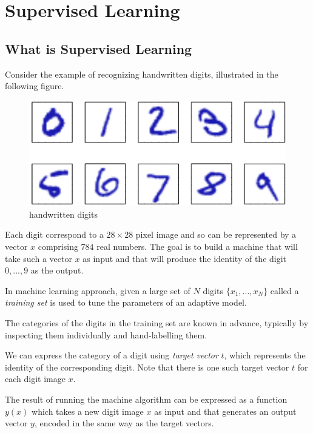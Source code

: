 \chapter{Supervised Learning}

\section{What is Supervised Learning}

Consider the example of recognizing handwritten digits, illustrated in the following figure.

\begin{figure}[h]
    \centering
    \includegraphics[scale=0.2]{chapter006/figures/fig001}
    \caption{handwritten digits}
    \label{handwritten digits}
\end{figure}

Each digit correspond to a $28 \times 28$ pixel image and so can be represented by a vector $x$ comprising $784$ real numbers. The goal is to build a machine that will take such a vector $x$ as input and that will produce the identity of the digit $0, ..., 9$ as the output.

In machine learning approach, given a large set of $N$ digits $\{x_1, ..., x_N\}$ called a \textit{training set} is used to tune the parameters of an adaptive model.

The categories of the digits in the training set are known in advance, typically by inspecting them individually and hand-labelling them.

We can express the category of a digit using \textit{target vector} $t$, which represents the identity of the corresponding digit. Note that there is one such target vector $t$ for each digit image $x$.

The result of running the machine algorithm can be expressed as a function $y(x)$ which takes a new digit image $x$ as input and that generates an output vector $y$, encoded in the same way as the target vectors.

